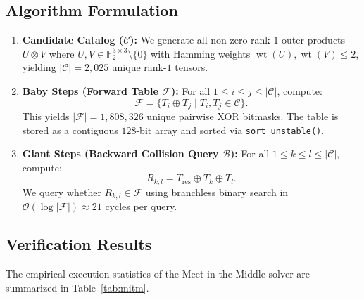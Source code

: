 \documentclass[11pt,reqno]{amsart}
\theoremstyle{plain}
\theoremstyle{definition}
\begin{document}
\subsection{Algorithm Formulation}

\begin{enumerate}
    \item \textbf{Candidate Catalog ($\mathcal{C}$):} We generate all non-zero rank-$1$ outer products $U \otimes V$ where $U, V \in \mathbb{F}_2^{3 \times 3} \setminus \{0\}$ with Hamming weights $\operatorname{wt}(U), \operatorname{wt}(V) \le 2$, yielding $|\mathcal{C}| = 2{,}025$ unique rank-$1$ tensors.
    \item \textbf{Baby Steps (Forward Table $\mathcal{F}$):} For all $1 \le i \le j \le |\mathcal{C}|$, compute:
    \begin{equation}
    \mathcal{F} = \{ T_i \oplus T_j \mid T_i, T_j \in \mathcal{C} \}.
    \end{equation}
    This yields $|\mathcal{F}| = 1{,}808{,}326$ unique pairwise XOR bitmasks. The table is stored as a contiguous $128$-bit array and sorted via \texttt{sort\_unstable()}.
    \item \textbf{Giant Steps (Backward Collision Query $\mathcal{B}$):} For all $1 \le k \le l \le |\mathcal{C}|$, compute:
    \begin{equation}
    R_{k, l} = T_{\mathrm{res}} \oplus T_k \oplus T_l.
    \end{equation}
    We query whether $R_{k, l} \in \mathcal{F}$ using branchless binary search in $\mathcal{O}(\log |\mathcal{F}|) \approx 21$ cycles per query.
\end{enumerate}

\subsection{Verification Results}

The empirical execution statistics of the Meet-in-the-Middle solver are summarized in Table~\ref{tab:mitm}.
\end{document}
